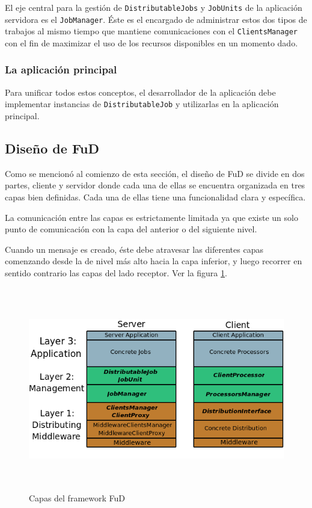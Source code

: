 El eje central para la gestión de \texttt{DistributableJobs} y \texttt{JobUnits} de la aplicación servidora es el \texttt{JobManager}. Éste es el encargado de
 administrar estos dos tipos de trabajos al mismo tiempo que mantiene comunicaciones con el \texttt{ClientsManager} con el fin de maximizar el uso de los recursos disponibles en un momento dado.

\subsubsection{La aplicación principal}

Para unificar todos estos conceptos, el desarrollador de la aplicación debe implementar instancias de \texttt{DistributableJob} y utilizarlas en la aplicación principal.

\subsection{Diseño de FuD}

Como se mencionó al comienzo de esta sección, el diseño de FuD se divide en dos partes, cliente y servidor donde cada una de ellas se encuentra organizada en
 tres capas bien definidas. Cada una de ellas tiene una funcionalidad clara y específica.

La comunicación entre las capas es estrictamente limitada ya que existe un solo punto de comunicación con la capa del anterior o del siguiente nivel.

Cuando un mensaje es creado, éste debe atravesar las diferentes capas comenzando desde la de nivel más alto hacia la capa inferior, y luego recorrer en
 sentido contrario las capas del lado receptor. Ver la figura \ref{fig:FuD-Design}.


\begin{figure}[H]
\begin{center}
  \includegraphics[height=3.5in,width=5.0in]{images/FuD-diseno.png}
\caption{Capas del framework FuD }
\label{fig:FuD-Design}
\end{center}
\end{figure} 


